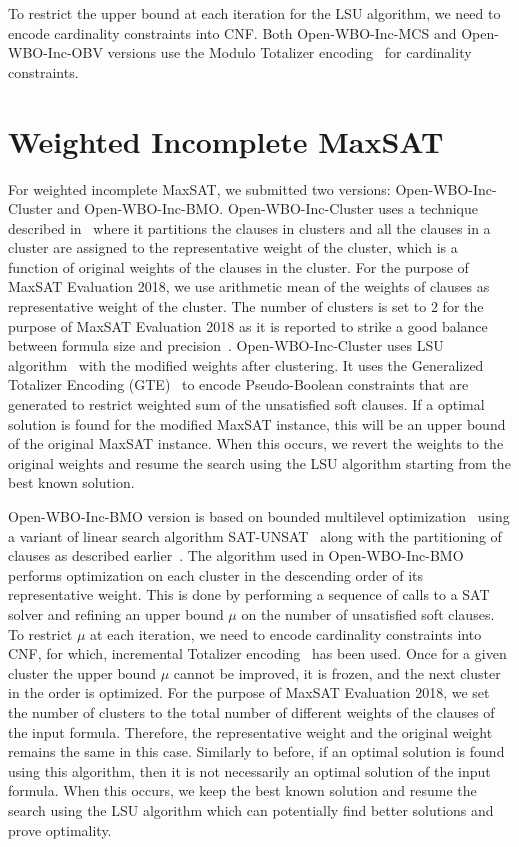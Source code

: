 \documentclass[conference]{IEEEtran}
\newcommand{\mcs}{\textsf{Open-WBO-Inc-MCS}\xspace}
\newcommand{\obv}{\textsf{Open-WBO-Inc-OBV}\xspace}
\newcommand{\weight}{\textsf{Open-WBO-Inc-Cluster}\xspace}
\newcommand{\ml}{\textsf{Open-WBO-Inc-BMO}\xspace}
\begin{document}
To restrict the upper bound at each iteration for the LSU algorithm, we need to encode cardinality constraints into CNF. Both \mcs and \obv versions use the Modulo Totalizer encoding~\cite{totalizer-ictai13} for cardinality constraints.


\section{Weighted Incomplete MaxSAT}

For weighted incomplete MaxSAT, we submitted two versions: \weight and \ml. 
%
\weight uses a technique described in~\cite{cp18} 
where it partitions the clauses in clusters and
all the clauses in a cluster are assigned to the representative
weight of the cluster, which is a function of original
weights of the clauses in the cluster. For the purpose of
MaxSAT Evaluation 2018,
we use arithmetic mean of the weights of clauses as representative weight of the
cluster. The number of clusters is set to $2$ for the purpose of MaxSAT
Evaluation 2018 as it is reported to strike a good balance
between formula size and precision~\cite{cp18}.
%
\weight uses LSU algorithm~\cite{berre-jsat10} with the modified weights after clustering. 
It uses the Generalized Totalizer Encoding
(GTE)~\cite{joshi-cp15} to encode Pseudo-Boolean constraints that
are generated to restrict weighted sum of the unsatisfied soft 
clauses. If a optimal solution is found for the modified MaxSAT instance, this will be an upper bound of the original MaxSAT instance. When this occurs, we revert the weights to the original 
weights and resume the search using the LSU algorithm starting from the best known solution.

\ml version is based on bounded multilevel optimization~\cite{marques-silva-amai11} 
using a variant of linear search algorithm
SAT-UNSAT~\cite{berre-jsat10} along with the partitioning
of clauses as described earlier~\cite{cp18}. The
algorithm used in \ml performs optimization on each cluster
in the descending order of its representative weight. This
is done by performing a sequence of calls to a SAT solver
and refining an upper bound $\mu$ on the number of
unsatisfied soft clauses. To restrict $\mu$ at each
iteration, we need to encode  cardinality constraints into
CNF, for which, incremental Totalizer
encoding~\cite{martins-cp14} has been used. Once for a given
cluster the upper bound $\mu$ cannot be improved, it is
frozen, and the next cluster in the order is optimized. For
the purpose of MaxSAT Evaluation 2018, we set the number of
clusters to the total number of different weights of
the clauses of the input formula. Therefore, the
representative weight and the original weight remains the
same in this case. Similarly to before, if an optimal solution is found 
using this algorithm, then it is not necessarily an optimal solution of the 
input formula. When this occurs, we keep the best known solution and resume the search 
using the LSU algorithm which can potentially find better solutions and prove optimality.
\end{document}
